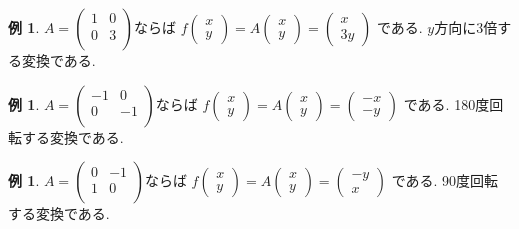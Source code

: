 \documentclass[dvipdfmx,a4paper,11pt]{article}
\theoremstyle{definition}
\newtheorem{exa}[thm]{例}
\begin{document}
   \begin{exa}
$
A=\begin{pmatrix}
1& 0 \\
0& 3 \\
\end{pmatrix}
$ならば
$
f\begin{pmatrix}
x \\ y
 \end{pmatrix} 
 =
 A
\begin{pmatrix}
x \\ y
 \end{pmatrix}  = 
 \begin{pmatrix}
x \\3y
 \end{pmatrix}
$
である. $y$方向に3倍する変換である. 
\end{exa}
 
 \begin{exa}
$
A=\begin{pmatrix}
-1& 0 \\
0& -1 \\
\end{pmatrix}
$ならば
$
f\begin{pmatrix}
x \\ y
 \end{pmatrix} 
 =
 A
\begin{pmatrix}
x \\ y
 \end{pmatrix}  = 
 \begin{pmatrix}
-x \\-y
 \end{pmatrix}
$
である. 180度回転する変換である.
\end{exa}
 
  \begin{exa}
$
A=\begin{pmatrix}
0& -1\\
1& 0 \\
\end{pmatrix}
$ならば
$
f\begin{pmatrix}
x \\ y
 \end{pmatrix} 
 =
 A
\begin{pmatrix}
x \\ y
 \end{pmatrix}  = 
 \begin{pmatrix}
-y \\x
 \end{pmatrix}
$
である. 90度回転する変換である.
\end{exa}
 
\end{document}
